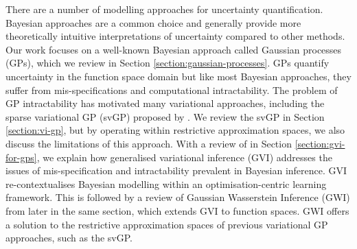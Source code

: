 \documentclass{article}
\numberwithin{equation}{section}
\begin{document}

There are a number of modelling approaches for uncertainty quantification. 
Bayesian approaches are a common choice and generally provide more theoretically intuitive interpretations of uncertainty compared to other methods. 
Our work focuses on a well-known Bayesian approach called Gaussian processes (GPs), which we review in Section \ref{section:gaussian-processes}.
GPs quantify uncertainty in the function space domain but like most Bayesian approaches, they suffer from mis-specifications and computational intractability. 
The problem of GP intractability has motivated many variational approaches, including the sparse variational GP (svGP) proposed by \cite{titsias2009variational}.
We review the svGP in Section \ref{section:vi-gp}, but by operating within restrictive approximation spaces, we also discuss the limitations of this approach. 
With a review of \cite{knoblauch2022optimization} in Section \ref{section:gvi-for-gps}, we explain how generalised variational inference (GVI) addresses the issues of mis-specification and intractability prevalent in Bayesian inference.
GVI re-contextualises Bayesian modelling within an optimisation-centric learning framework.
This is followed by a review of Gaussian Wasserstein Inference (GWI) from \cite{wild2022generalized} later in the same section, which extends GVI to function spaces.
GWI offers a solution to the restrictive approximation spaces of previous variational GP approaches, such as the svGP.
\end{document}
